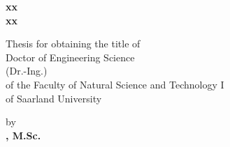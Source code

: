 \begin{titlepage}
\def\docdate{2010}

\newlength{\longskip}
\setlength{\longskip}{0.03\textheight}

\sffamily
{}

\begin{center}

\hrulefill\par
\huge{
    \vspace{0.5cm}
    \textbf{ xx }\\[0.35cm]
    \textbf{xx}\\[0.5cm]  
      }
\hrulefill\par
{}

\Large
Thesis for obtaining the title of  \\
Doctor of Engineering Science \\
(Dr.-Ing.)\\
of the Faculty of Natural Science and Technology I\\ 
of Saarland University



by \\%
\textbf{, M.Sc.} \\[1em]






\end{center}
\end{titlepage}
